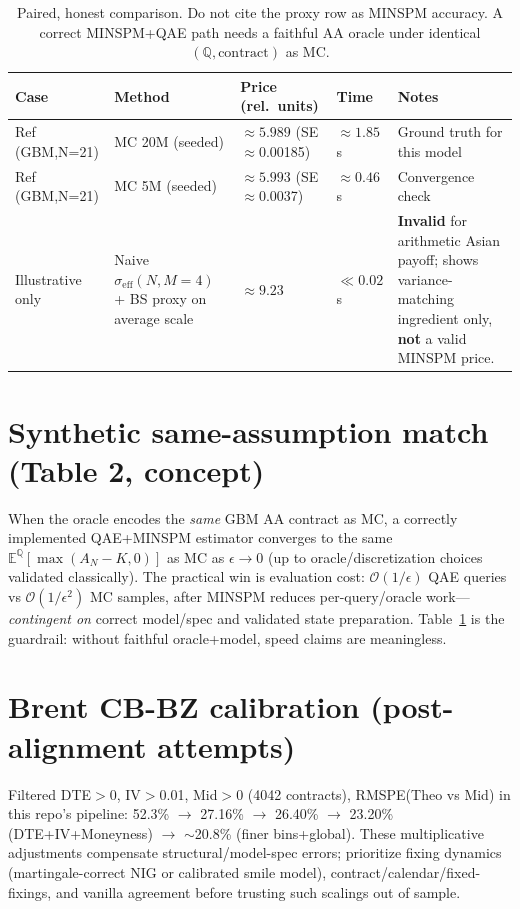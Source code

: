 \documentclass[11pt,a4paper]{article}
\begin{document}
\begin{table}[h]
\centering
\small
\begin{tabular}{p{2.6cm}p{3.2cm}p{2.2cm}p{1.6cm}p{4.8cm}}
\toprule
Case & Method & Price (rel.\ units) & Time & Notes \\
\midrule
Ref (GBM,N=21) & MC 20M (seeded) & $\approx 5.989$ (SE$\approx$0.00185) & $\approx 1.85$ s & Ground truth for this model \\
Ref (GBM,N=21) & MC 5M (seeded)  & $\approx 5.993$ (SE$\approx$0.0037)  & $\approx 0.46$ s & Convergence check \\
Illustrative only & Naive $\sigma_{\mathrm{eff}}(N,M{=}4)$ + BS proxy on average scale & $\approx 9.23$ & $\ll 0.02$ s & \textbf{Invalid} for arithmetic Asian payoff; shows variance-matching ingredient only, \textbf{not} a valid MINSPM price. \\
\bottomrule
\end{tabular}
\caption{Paired, honest comparison. Do not cite the proxy row as MINSPM accuracy. A correct MINSPM+QAE path needs a faithful AA oracle under identical $(\mathbb{Q},\text{contract})$ as MC.}
\label{tab:rev1}
\end{table}

\section{Synthetic same-assumption match (Table 2, concept)}
When the oracle encodes the \emph{same} GBM AA contract as MC, a correctly implemented QAE+MINSPM estimator converges to the same $\mathbb{E}^{\mathbb{Q}}[\max(A_N-K,0)]$ as MC as $\epsilon\to 0$ (up to oracle/discretization choices validated classically). The practical win is evaluation cost: $\mathcal{O}(1/\epsilon)$ QAE queries vs $\mathcal{O}(1/\epsilon^2)$ MC samples, after MINSPM reduces per-query/oracle work---\emph{contingent on} correct model/spec and validated state preparation. Table~\ref{tab:rev1} is the guardrail: without faithful oracle+model, speed claims are meaningless.

\section{Brent CB-BZ calibration (post-alignment attempts)}
Filtered DTE$>$0, IV$>$0.01, Mid$>$0 (4042 contracts), RMSPE(Theo vs Mid) in this repo’s pipeline: 52.3\% $\to$ 27.16\% $\to$ 26.40\% $\to$ 23.20\% (DTE+IV+Moneyness) $\to$ $\sim$20.8\% (finer bins+global). These multiplicative adjustments compensate structural/model-spec errors; prioritize fixing dynamics (martingale-correct NIG or calibrated smile model), contract/calendar/fixed-fixings, and vanilla agreement before trusting such scalings out of sample.
\end{document}
